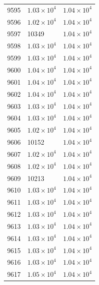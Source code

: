 \begin{table}[H]
\begin{tabular}{lll}
9595 & $\displaystyle 1.03 \times 10^{4}$ & $\displaystyle 1.04 \times 10^{4}$ \\
9596 & $\displaystyle 1.02 \times 10^{4}$ & $\displaystyle 1.04 \times 10^{4}$ \\
9597 & 10349 & $\displaystyle 1.04 \times 10^{4}$ \\
9598 & $\displaystyle 1.03 \times 10^{4}$ & $\displaystyle 1.04 \times 10^{4}$ \\
9599 & $\displaystyle 1.03 \times 10^{4}$ & $\displaystyle 1.04 \times 10^{4}$ \\
9600 & $\displaystyle 1.04 \times 10^{4}$ & $\displaystyle 1.04 \times 10^{4}$ \\
9601 & $\displaystyle 1.04 \times 10^{4}$ & $\displaystyle 1.04 \times 10^{4}$ \\
9602 & $\displaystyle 1.04 \times 10^{4}$ & $\displaystyle 1.04 \times 10^{4}$ \\
9603 & $\displaystyle 1.03 \times 10^{4}$ & $\displaystyle 1.04 \times 10^{4}$ \\
9604 & $\displaystyle 1.03 \times 10^{4}$ & $\displaystyle 1.04 \times 10^{4}$ \\
9605 & $\displaystyle 1.02 \times 10^{4}$ & $\displaystyle 1.04 \times 10^{4}$ \\
9606 & 10152 & $\displaystyle 1.04 \times 10^{4}$ \\
9607 & $\displaystyle 1.02 \times 10^{4}$ & $\displaystyle 1.04 \times 10^{4}$ \\
9608 & $\displaystyle 1.02 \times 10^{4}$ & $\displaystyle 1.04 \times 10^{4}$ \\
9609 & 10213 & $\displaystyle 1.04 \times 10^{4}$ \\
9610 & $\displaystyle 1.03 \times 10^{4}$ & $\displaystyle 1.04 \times 10^{4}$ \\
9611 & $\displaystyle 1.03 \times 10^{4}$ & $\displaystyle 1.04 \times 10^{4}$ \\
9612 & $\displaystyle 1.03 \times 10^{4}$ & $\displaystyle 1.04 \times 10^{4}$ \\
9613 & $\displaystyle 1.03 \times 10^{4}$ & $\displaystyle 1.04 \times 10^{4}$ \\
9614 & $\displaystyle 1.03 \times 10^{4}$ & $\displaystyle 1.04 \times 10^{4}$ \\
9615 & $\displaystyle 1.03 \times 10^{4}$ & $\displaystyle 1.04 \times 10^{4}$ \\
9616 & $\displaystyle 1.03 \times 10^{4}$ & $\displaystyle 1.04 \times 10^{4}$ \\
9617 & $\displaystyle 1.05 \times 10^{4}$ & $\displaystyle 1.04 \times 10^{4}$ \\

\end{tabular}
\end{table}
